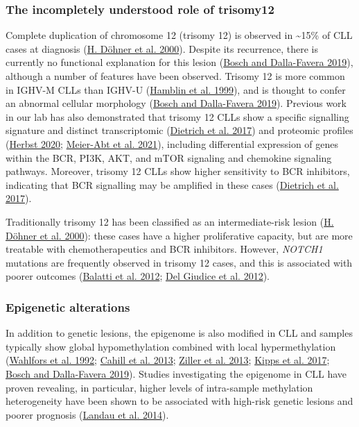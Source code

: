 \documentclass[11pt, a4paper, twosided]{book}
\begin{document}
\hypertarget{intro-trisomy12}{%
\subsubsection{The incompletely understood role of trisomy12}\label{intro-trisomy12}}

Complete duplication of chromosome 12 (trisomy 12) is observed in \textasciitilde15\% of CLL cases at diagnosis (\protect\hyperlink{ref-Dohner2000}{H. Döhner et al. 2000}). Despite its recurrence, there is currently no functional explanation for this lesion (\protect\hyperlink{ref-Bosch2019}{Bosch and Dalla-Favera 2019}), although a number of features have been observed. Trisomy 12 is more common in IGHV-M CLLs than IGHV-U (\protect\hyperlink{ref-Hamblin1999}{Hamblin et al. 1999}), and is thought to confer an abnormal cellular morphology (\protect\hyperlink{ref-Bosch2019}{Bosch and Dalla-Favera 2019}). Previous work in our lab has also demonstrated that trisomy 12 CLLs show a specific signalling signature and distinct transcriptomic (\protect\hyperlink{ref-JCIpaper}{Dietrich et al. 2017}) and proteomic profiles (\protect\hyperlink{ref-HerbstThesis}{Herbst 2020}; \protect\hyperlink{ref-MeierAbt2021}{Meier-Abt et al. 2021}), including differential expression of genes within the BCR, PI3K, AKT, and mTOR signaling and chemokine signaling pathways. Moreover, trisomy 12 CLLs show higher sensitivity to BCR inhibitors, indicating that BCR signalling may be amplified in these cases (\protect\hyperlink{ref-JCIpaper}{Dietrich et al. 2017}).

Traditionally trisomy 12 has been classified as an intermediate-risk lesion (\protect\hyperlink{ref-Dohner2000}{H. Döhner et al. 2000}): these cases have a higher proliferative capacity, but are more treatable with chemotherapeutics and BCR inhibitors. However, \emph{NOTCH1} mutations are frequently observed in trisomy 12 cases, and this is associated with poorer outcomes (\protect\hyperlink{ref-Balatti2012}{Balatti et al. 2012}; \protect\hyperlink{ref-Giudice2012}{Del Giudice et al. 2012}).

\hypertarget{intro-epigenetic-alterations}{%
\subsubsection{Epigenetic alterations}\label{intro-epigenetic-alterations}}

In addition to genetic lesions, the epigenome is also modified in CLL and samples typically show global hypomethylation combined with local hypermethylation (\protect\hyperlink{ref-Wahlfors1992}{Wahlfors et al. 1992}; \protect\hyperlink{ref-Cahill2013}{Cahill et al. 2013}; \protect\hyperlink{ref-Ziller2013}{Ziller et al. 2013}; \protect\hyperlink{ref-Kipps2017}{Kipps et al. 2017}; \protect\hyperlink{ref-Bosch2019}{Bosch and Dalla-Favera 2019}). Studies investigating the epigenome in CLL have proven revealing, in particular, higher levels of intra-sample methylation heterogeneity have been shown to be associated with high-risk genetic lesions and poorer prognosis (\protect\hyperlink{ref-Landau2014}{Landau et al. 2014}).
\end{document}

